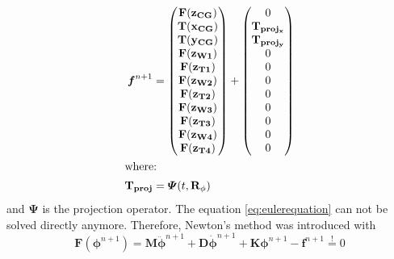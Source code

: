 \begin{align}
    \boldsymbol{f}^{n+1} &= \begin{pmatrix} 
                            \mathbf{F(z_{CG})}\\
                            \mathbf{T(x_{CG})}\\
                            \mathbf{T(y_{CG})}\\
                            \mathbf{F(z_{W1})}\\
                            \mathbf{F(z_{T1})}\\
                            \mathbf{F(z_{W2})}\\
                            \mathbf{F(z_{T2})}\\
                            \mathbf{F(z_{W3})}\\
                            \mathbf{F(z_{T3})}\\
                            \mathbf{F(z_{W4})}\\
                            \mathbf{F(z_{T4})}
                            \end{pmatrix} + 
                            \begin{pmatrix} 
                            0\\
                            \mathbf{T_{proj_{x}}}\\
                            \mathbf{T_{proj_{y}}}\\
                            0\\
                            0\\
                            0\\
                            0\\
                            0\\
                            0\\
                            0\\
                            0\\
                            \end{pmatrix} \\ \intertext{where:}
    \mathbf{T_{proj}} &= \boldsymbol{\Psi}(t, \mathbf{R}_{\phi})
    \label{eq:f_Eulerian}
\end{align}
and $\boldsymbol{\Psi}$ is the projection operator.
The equation \eqref{eq:eulerequation} can not be solved directly anymore. Therefore, Newton's method was introduced with 
\begin{equation}
     \boldsymbol{F}(\boldsymbol{\phi}^{n+1}) = \boldsymbol{M} \ddot{\boldsymbol{\phi}}^{n+1}+ \boldsymbol{D} \dot{\boldsymbol{\phi}}^{n+1} + \boldsymbol{K}\boldsymbol{\phi}^{n+1}-\boldsymbol{f}^{n+1}\overset{!}{=}0
\end{equation}
